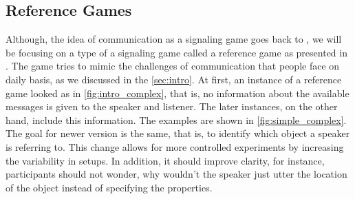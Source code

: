 \documentclass[11pt,a4paper]{article}
\begin{document}
\subsection{Reference Games}
Although, the idea of communication as a signaling game goes back to \cite{Lewis_1969}, we will be focusing on a type of a signaling game called a reference game as presented in \cite{Frank_2012}. The game tries to mimic the challenges of communication that people face on daily basis, as we discussed in the \autoref{sec:intro}. At first, an instance of a reference game looked as in \autoref{fig:intro_complex}, that is, no information about the available messages is given to the speaker and listener. The later instances, on the other hand, include this information. The examples are shown in \autoref{fig:simple_complex}. The goal for newer version is the same, that is, to identify which object a speaker is referring to. This change allows for more controlled experiments by increasing the variability in setups. In addition, it should improve clarity, for instance, participants should not wonder, why wouldn't the speaker just utter the location of the object instead of specifying the properties.
\end{document}
